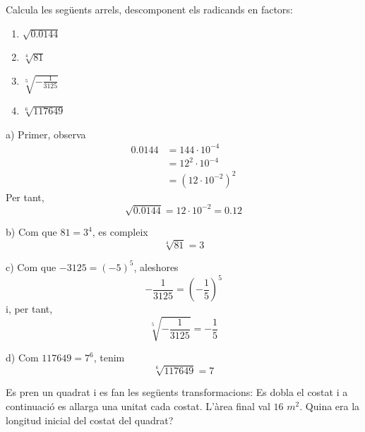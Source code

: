 \begin{exercici}
Calcula les següents arrels, descomponent els radicands en
factors:

\begin{enumerate}
\item[a)] $\sqrt{0.0144}$

\item[b)] $\sqrt[4]{81}$

\item[c)] $\sqrt[5]{-\frac{1}{3125}}$

\item[d)] $\sqrt[6]{117649}$
\end{enumerate}

\end{exercici}

\begin{solucio}
a) Primer, observa%
\begin{align*}
0.0144 &=144\cdot 10^{-4} \\
&=12^{2}\cdot 10^{-4} \\
&=\left( 12\cdot 10^{-2}\right) ^{2}
\end{align*}%
Per tant, 
\begin{equation*}
\sqrt{0.0144}=12\cdot 10^{-2}=0.12
\end{equation*}

b) Com que $81=3^{4}$, es compleix%
\begin{equation*}
\sqrt[4]{81}=3
\end{equation*}

c) Com que $-3125=(-5)^{5}$, aleshores%
\begin{equation*}
-\frac{1}{3125}=\left( -\frac{1}{5}\right) ^{5}
\end{equation*}%
i, per tant,%
\begin{equation*}
\sqrt[5]{-\frac{1}{3125}}=-\frac{1}{5}
\end{equation*}

d) Com $117649=7^{6}$, tenim%
\begin{equation*}
\sqrt[6]{117649}=7
\end{equation*}
\end{solucio}

\begin{exercici}
Es pren un quadrat i es fan les següents transformacions: Es dobla el
costat i a continuació es allarga una unitat cada costat. L’àrea final
val $16$ $m^{2}$. Quina era la longitud inicial del
costat del quadrat?

\end{exercici}

